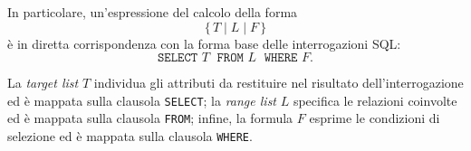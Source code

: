 In particolare, un’espressione del calcolo della forma
\[
\{\, T \mid L \mid F \,\}
\]
è in diretta corrispondenza con la forma base delle interrogazioni SQL:
\[
\texttt{SELECT } T \;\texttt{ FROM } L \;\texttt{ WHERE } F.
\]

La \emph{target list} $T$ individua gli attributi da restituire nel risultato
dell’interrogazione ed è mappata sulla clausola \texttt{SELECT};
la \emph{range list} $L$ specifica le relazioni coinvolte ed è mappata sulla
clausola \texttt{FROM};
infine, la formula $F$ esprime le condizioni di selezione ed è mappata sulla
clausola \texttt{WHERE}.
